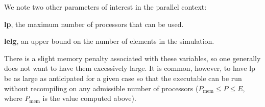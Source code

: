 We note two other parameters of interest in the parallel context:
\begin{description}
\item{\bf lp}, the maximum number of processors that can be used.
\item{\bf lelg}, an upper bound on the number of elements in the simulation.
\end{description}
\noindent
There is a slight memory penalty associated with these variables, so
one generally does not want to have them excessively large.  It is 
common, however, to have lp be as large as anticipated for a given
case so that the executable can be run without recompiling on
any admissible number of processors (\(P_{\mbox{mem}} \le P \le E\),
where \(P_{\mbox{mem}}\) is the value computed above).

